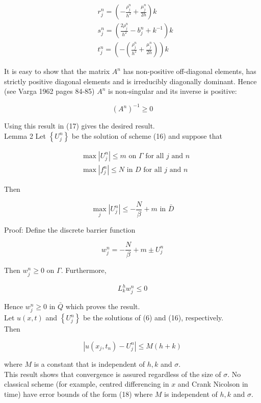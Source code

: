 \documentclass[10pt]{article}
\begin{document}
$$
\begin{aligned}
& r_{j}^{n}=\left(-\frac{\rho_{j}^{n}}{h^{2}}+\frac{\mu_{j}^{n}}{2 h}\right) k \\
& s_{j}^{n}=\left(\frac{2 \rho_{j}^{n}}{h^{2}}-b_{j}^{n}+k^{-1}\right) k \\
& t_{j}^{n}=\left(-\left(\frac{\rho_{j}^{n}}{h^{2}}+\frac{\mu_{j}^{n}}{2 h}\right)\right) k
\end{aligned}
$$

It is easy to show that the matrix $A^{n}$ has non-positive off-diagonal elements, has strictly positive diagonal elements and is irreducibly diagonally dominant. Hence (see Varga 1962 pages 84-85) $A^{n}$ is non-singular and its inverse is positive:

$$
\left(A^{n}\right)^{-1} \geq 0
$$

Using this result in (17) gives the desired result.\\
Lemma 2 Let $\left\{U_{j}^{n}\right\}$ be the solution of scheme (16) and suppose that

$$
\begin{aligned}
& \max \left|U_{j}^{n}\right| \leq m \text { on } \Gamma \text { for all } j \text { and } n \\
& \max \left|f_{j}^{n}\right| \leq N \text { in } D \text { for all } j \text { and } n
\end{aligned}
$$

Then

$$
\max _{j}\left|U_{j}^{n}\right| \leq-\frac{N}{\beta}+m \text { in } \bar{D}
$$

Proof: Define the discrete barrier function

$$
w_{j}^{n}=-\frac{N}{\beta}+m \pm U_{j}^{n}
$$

Then $w_{j}^{n} \geq 0$ on $\Gamma$. Furthermore,

$$
L_{k}^{h} w_{j}^{n} \leq 0
$$

Hence $w_{j}^{n} \geq 0$ in $\bar{Q}$ which proves the result.\\
Let $u(x, t)$ and $\left\{U_{j}^{n}\right\}$ be the solutions of (6) and (16), respectively.\\
Then


\begin{equation*}
\left|u\left(x_{j}, t_{n}\right)-U_{j}^{n}\right| \leq M(h+k) \tag{18}
\end{equation*}


where $M$ is a constant that is independent of $h, k$ and $\sigma$.\\
This result shows that convergence is assured regardless of the size of $\sigma$. No classical scheme (for example, centred differencing in $x$ and Crank Nicolson in time) have error bounds of the form (18) where $M$ is independent of $h, k$ and $\sigma$.
\end{document}
